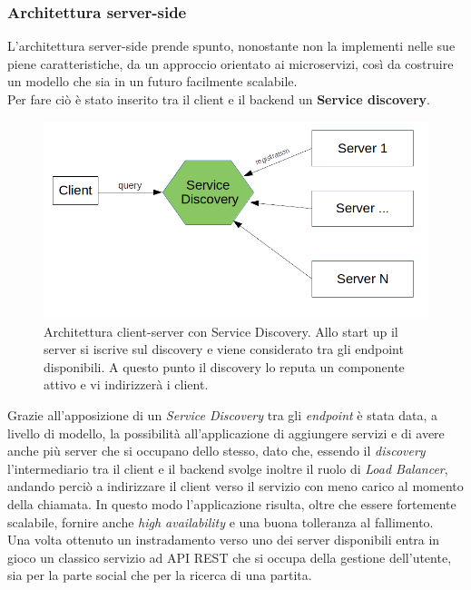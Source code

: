         
            \subsubsection{Architettura server-side}\label{subsub:architecture:server}
            L'architettura server-side prende spunto, nonostante non la implementi nelle sue piene caratteristiche, da un approccio orientato ai microservizi, così da costruire un modello che sia in un futuro facilmente scalabile. \\
            
            Per fare ciò è stato inserito tra il client e il backend un \textbf{Service discovery}. 
            
            \begin{figure}[h!]
                \includegraphics[scale=0.6]{image/ArchitetturaDiscovery.png}
                \caption{Architettura client-server con Service Discovery. Allo start up il server si iscrive sul discovery e viene considerato tra gli endpoint disponibili. A questo punto il discovery lo reputa un componente attivo e vi indirizzerà i client.}
            \end{figure}

            Grazie all'apposizione di un \textit{Service Discovery} tra gli \textit{endpoint} è stata data, a livello di modello, la possibilità all'applicazione di aggiungere servizi e di avere anche più server che si occupano dello stesso, dato che, essendo il \textit{discovery} l'intermediario tra il client e il backend svolge inoltre il ruolo di \textit{Load Balancer}, andando perciò a indirizzare il client verso il servizio con meno carico al momento della chiamata.
            In questo modo l'applicazione risulta, oltre che essere fortemente scalabile, fornire anche \textit{high availability} e una buona tolleranza al fallimento. 
            \\
            Una volta ottenuto un instradamento verso uno dei server disponibili entra in gioco un classico servizio ad API REST che si occupa della gestione dell'utente, sia per la parte social che per la ricerca di una partita. 
            
